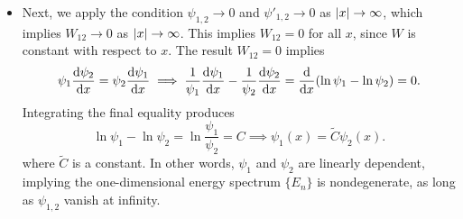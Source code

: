 \documentclass[11pt, a4paper]{article}
\renewcommand{\t}[1]{\tilde{#1}}
\newcommand{\p}{\psi}  %
\begin{document}
\begin{itemize}
	\item Next, we apply the condition $ \p_{1, 2} \to 0 $ and $ \p'_{1, 2} \to 0 $ as $ \abs{x} \to \infty $, which implies $ W_{12} \to 0 $ as $ \abs{x} \to \infty  $. This implies $ W_{12} = 0 $ for all $ x $, since $ W $ is constant with respect to $ x $. The result $ W_{12} = 0 $ implies
	\begin{equation*}
		\p_{1}\dv{\p_{2}}{x} = \p_{2}\dv{\p_{1}}{x} \implies \frac{1}{\p_{1}} \dv{\p_{1}}{x} - \frac{1}{\p_{2}} \dv{\p_{2}}{x} = \dv{x}(\ln \p_{1} - \ln \p_{2}) = 0.
	\end{equation*}
	Integrating the final equality produces
	\begin{equation*}
		\ln \p_{1} - \ln \p_{2} = \ln \frac{\p_{1}}{\p_{2}} = C \implies \p_{1}(x) = \t{C} \p_{2}(x).
	\end{equation*}
	where $ \t{C} $ is a constant. In other words, $ \p_{1} $ and $ \p_{2} $ are linearly dependent, implying the one-dimensional energy spectrum $ \{E_{n}\} $ is nondegenerate, as long as $ \p_{1,2} $ vanish at infinity.
\end{itemize}
\end{document}
